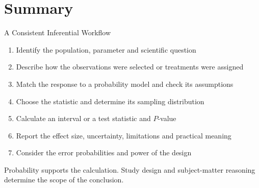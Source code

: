 \documentclass[aspectratio=169]{beamer}
\begin{document}
\section{Summary}

\begin{frame}{A Consistent Inferential Workflow}
\begin{enumerate}
  \item Identify the population, parameter and scientific question
  \item Describe how the observations were selected or treatments were assigned
  \item Match the response to a probability model and check its assumptions
  \item Choose the statistic and determine its sampling distribution
  \item Calculate an interval or a test statistic and $P$-value
  \item Report the effect size, uncertainty, limitations and practical meaning
  \item Consider the error probabilities and power of the design
\end{enumerate}

\vspace{0.2cm}
Probability supports the calculation. Study design and subject-matter reasoning determine the scope of the conclusion.
\end{frame}
\end{document}
